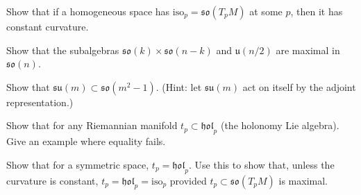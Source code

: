 \begin{remark}
  \label{rem:pet-ch10-exercise-isop-so-constant-curvature}

  Show that if a homogeneous space has $\mathrm{iso}_p=\mathfrak{so}(T_pM)$ at
  some $p$, then it has constant curvature.
\end{remark}

\begin{remark}
  \label{rem:pet-ch10-exercise-maximal-subalgebras-son}

  Show that the subalgebras $\mathfrak{so}(k)\times\mathfrak{so}(n-k)$ and
  $\mathfrak u(n/2)$ are maximal in $\mathfrak{so}(n)$.
\end{remark}

\begin{remark}
  \label{rem:pet-ch10-exercise-sum-in-so}

  Show that $\mathfrak{su}(m)\subset\mathfrak{so}(m^2-1)$. (Hint: let
  $\mathfrak{su}(m)$ act on itself by the adjoint representation.)
\end{remark}

\begin{remark}
  \label{rem:pet-ch10-exercise-tp-subset-holp}

  Show that for any Riemannian manifold $t_p\subset\mathfrak{hol}_p$ (the
  holonomy Lie algebra). Give an example where equality fails.
\end{remark}

\begin{remark}[$t_p=\mathfrak{hol}_p$ for symmetric spaces]
  \label{rem:pet-ch10-exercise-tp-equals-holp-symmetric}

  Show that for a symmetric space, $t_p=\mathfrak{hol}_p$. Use this to show
  that, unless the curvature is constant, $t_p=\mathfrak{hol}_p=\mathrm{iso}_p$
  provided $t_p\subset\mathfrak{so}(T_pM)$ is maximal.
\end{remark}

